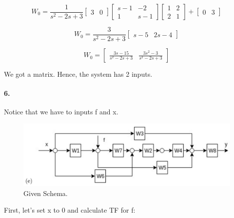 \documentclass{article}
\begin{document}
            
        $$W_0 = 
            \frac{1}{s^2 - 2s + 3}
            \begin{bmatrix}
                3 & 0
            \end{bmatrix}
             \begin{bmatrix}
                s - 1 & -2\\
                1 & s - 1
            \end{bmatrix}
             \begin{bmatrix}
                1 & 2\\
                2 & 1
            \end{bmatrix} + 
            \begin{bmatrix}
                0 & 3
            \end{bmatrix}$$
            
         $$W_0 = \frac{3}{s^2 - 2s + 3}
            \begin{bmatrix}
                s-5 & 2s-4
            \end{bmatrix}$$
            
        $$W_0 =
        \begin{bmatrix}
                \frac{3s-15}{s^2-2s+3} & \frac{3s^2-3}{s^2-2s+3}
        \end{bmatrix}$$
        
        We got a matrix. Hence, the system has 2 inputs.
   
        
    \paragraph{6.}
        
        Notice that we have to inputs f and x.
        
        
        \begin{figure}[hbt!]
            \centering
            \includegraphics[scale=0.2]{hm2_6_1.png}
            \caption{Given Schema.}
        \end{figure}
        
        First, let's set x to 0 and calculate TF for f: 
        
\end{document}

